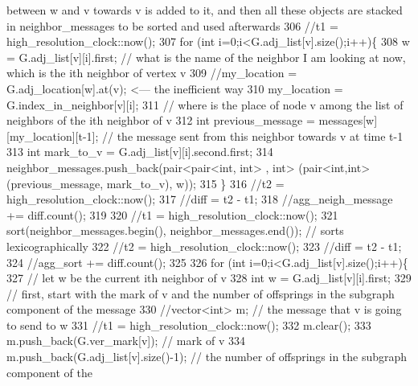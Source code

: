 \begin{DoxyCode}
{       between w and v towards v is added to it, and then all these objects are stacked in neighbor\_messages to be
       sorted and used afterwards}
306 \textcolor{comment}{        //t1 = high\_resolution\_clock::now();}
307 \textcolor{comment}{        for (int i=0;i<G.adj\_list[v].size();i++)\{}
308 \textcolor{comment}{          w = G.adj\_list[v][i].first; // what is the name of the neighbor I am looking at now, which is the
       ith neighbor of vertex v }
309 \textcolor{comment}{          //my\_location = G.adj\_location[w].at(v); <--- the inefficient way}
310 \textcolor{comment}{          my\_location = G.index\_in\_neighbor[v][i];}
311 \textcolor{comment}{          // where is the place of node v among the list of neighbors of the ith neighbor of v}
312 \textcolor{comment}{          int previous\_message = messages[w][my\_location][t-1]; // the message sent from this neighbor
       towards v at time t-1}
313 \textcolor{comment}{          int mark\_to\_v = G.adj\_list[v][i].second.first;}
314 \textcolor{comment}{          neighbor\_messages.push\_back(pair<pair<int, int> , int> (pair<int,int>(previous\_message,
       mark\_to\_v), w));}
315 \textcolor{comment}{        \}}
316 \textcolor{comment}{        //t2 = high\_resolution\_clock::now();}
317 \textcolor{comment}{        //diff = t2 - t1;}
318 \textcolor{comment}{        //agg\_neigh\_message += diff.count();}
319 \textcolor{comment}{}
320 \textcolor{comment}{        //t1 = high\_resolution\_clock::now();}
321 \textcolor{comment}{        sort(neighbor\_messages.begin(), neighbor\_messages.end()); // sorts lexicographically}
322 \textcolor{comment}{        //t2 = high\_resolution\_clock::now();}
323 \textcolor{comment}{        //diff = t2 - t1;}
324 \textcolor{comment}{        //agg\_sort += diff.count();}
325 \textcolor{comment}{}
326 \textcolor{comment}{        for (int i=0;i<G.adj\_list[v].size();i++)\{}
327 \textcolor{comment}{          // let w be the current ith neighbor of v}
328 \textcolor{comment}{          int w = G.adj\_list[v][i].first;}
329 \textcolor{comment}{          // first, start with the mark of v and the number of offsprings in the subgraph component of the
       message}
330 \textcolor{comment}{          //vector<int> m; // the message that v is going to send to w}
331 \textcolor{comment}{          //t1 = high\_resolution\_clock::now();}
332 \textcolor{comment}{          m.clear();}
333 \textcolor{comment}{          m.push\_back(G.ver\_mark[v]); // mark of v}
334 \textcolor{comment}{          m.push\_back(G.adj\_list[v].size()-1); // the number of offsprings in the subgraph component of the
}
\end{DoxyCode}

